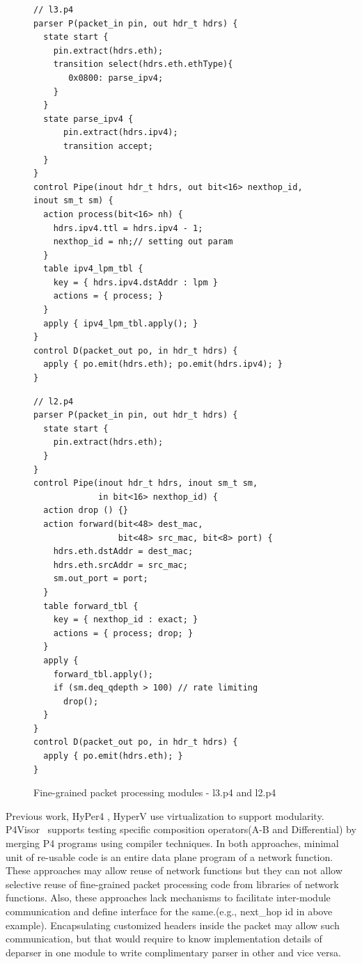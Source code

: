 \documentclass{hotnets19}
\begin{document}
\begin{figure}[ht]
\noindent \begin{minipage}[t]{.48\textwidth}
\begin{lstlisting}[frame=none]
// l3.p4
parser P(packet_in pin, out hdr_t hdrs) {
  state start {
    pin.extract(hdrs.eth);
    transition select(hdrs.eth.ethType){
       0x0800: parse_ipv4;
    }
  }
  state parse_ipv4 {
      pin.extract(hdrs.ipv4);
      transition accept;
  }
}
control Pipe(inout hdr_t hdrs, out bit<16> nexthop_id, inout sm_t sm) {
  action process(bit<16> nh) {
    hdrs.ipv4.ttl = hdrs.ipv4 - 1;
    nexthop_id = nh;// setting out param
  }
  table ipv4_lpm_tbl {
    key = { hdrs.ipv4.dstAddr : lpm } 
    actions = { process; }
  }
  apply { ipv4_lpm_tbl.apply(); }
}
control D(packet_out po, in hdr_t hdrs) {
  apply { po.emit(hdrs.eth); po.emit(hdrs.ipv4); }
}
\end{lstlisting}
\end{minipage}
\hfill\begin{minipage}[t]{.48\textwidth}
\begin{lstlisting}[frame=none]
// l2.p4
parser P(packet_in pin, out hdr_t hdrs) {
  state start {
    pin.extract(hdrs.eth);
  }
}
control Pipe(inout hdr_t hdrs, inout sm_t sm, 
             in bit<16> nexthop_id) {
  action drop () {}           
  action forward(bit<48> dest_mac, 
                 bit<48> src_mac, bit<8> port) {
    hdrs.eth.dstAddr = dest_mac;
    hdrs.eth.srcAddr = src_mac;
    sm.out_port = port;    
  }
  table forward_tbl {
    key = { nexthop_id : exact; } 
    actions = { process; drop; }
  }
  apply {
    forward_tbl.apply(); 
    if (sm.deq_qdepth > 100) // rate limiting
      drop();
  }
}
control D(packet_out po, in hdr_t hdrs) {
  apply { po.emit(hdrs.eth); }
}
\end{lstlisting}
\end{minipage}
\caption{Fine-grained packet processing modules - l3.p4  and l2.p4}
\label{fig:l3.p4.l2.p4}
\end{figure}



Previous work, HyPer4 \cite{Hancock:2016:HUP:2999572.2999607}, HyperV \cite{8038396} use virtualization to support modularity.
P4Visor~\cite{Zheng:2018:PLV:3281411.3281436} supports testing specific composition operators(A-B and Differential) by merging P4 programs using compiler techniques.
In both approaches, minimal unit of re-usable code is an entire data plane program of a network function. 
These approaches may allow reuse of network functions but they can not allow selective reuse of fine-grained packet processing code from libraries of network functions.
Also, these approaches lack mechanisms to facilitate inter-module communication and define interface for the same.(e.g., next\_hop id in above example).
Encapsulating customized headers inside the packet may allow such communication, but that would require to know implementation details of deparser in one module to write complimentary parser in other and vice versa. 
\end{document}
